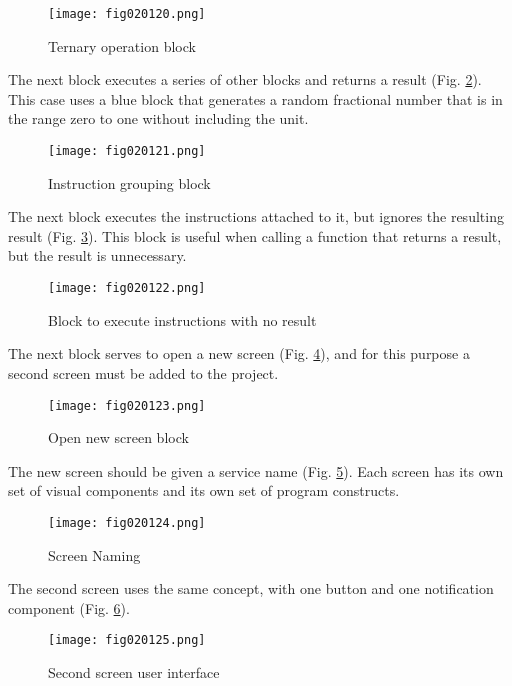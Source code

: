 \begin{figure}[H]
   \centering
   \texttt{[image: fig020120.png]}
   \caption{Ternary operation block}
\label{fig020120}
\end{figure}

The next block executes a series of other blocks and returns a result (Fig. \ref{fig020121}). This case uses a blue block that generates a random fractional number that is in the range zero to one without including the unit.

\begin{figure}[H]
   \centering
   \texttt{[image: fig020121.png]}
   \caption{Instruction grouping block}
\label{fig020121}
\end{figure}

The next block executes the instructions attached to it, but ignores the resulting result (Fig. \ref{fig020122}). This block is useful when calling a function that returns a result, but the result is unnecessary.

\begin{figure}[H]
   \centering
   \texttt{[image: fig020122.png]}
   \caption{Block to execute instructions with no result}
\label{fig020122}
\end{figure}

The next block serves to open a new screen (Fig. \ref{fig020123}), and for this purpose a second screen must be added to the project.

\begin{figure}[H]
   \centering
   \texttt{[image: fig020123.png]}
   \caption{Open new screen block}
\label{fig020123}
\end{figure}

The new screen should be given a service name (Fig. \ref{fig020124}). Each screen has its own set of visual components and its own set of program constructs.

\begin{figure}[H]
   \centering
   \texttt{[image: fig020124.png]}
   \caption{Screen Naming}
\label{fig020124}
\end{figure}

The second screen uses the same concept, with one button and one notification component (Fig. \ref{fig020125}).

\begin{figure}[H]
   \centering
   \texttt{[image: fig020125.png]}
   \caption{Second screen user interface}
\label{fig020125}
\end{figure}

